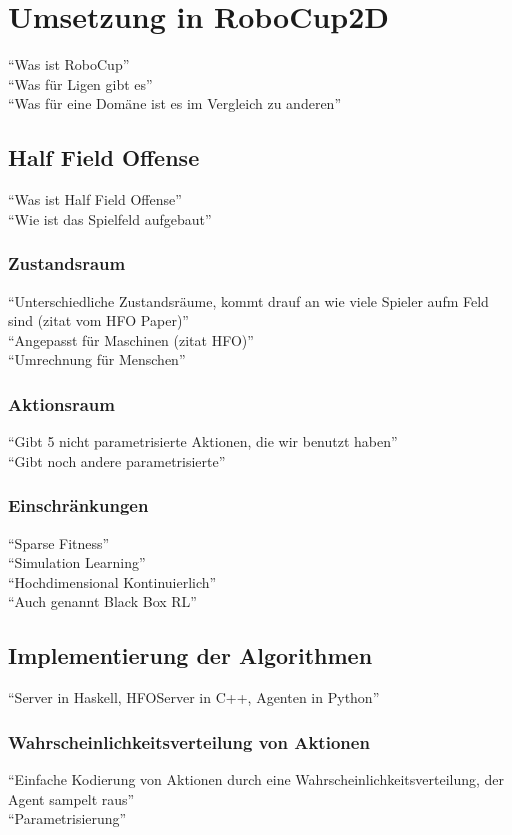 \chapter{Umsetzung in RoboCup2D}
    ``Was ist RoboCup'' \\
    ``Was für Ligen gibt es'' \\
    ``Was für eine Domäne ist es im Vergleich zu anderen''
    \section{Half Field Offense}
        ``Was ist Half Field Offense'' \\
        ``Wie ist das Spielfeld aufgebaut''
        \subsection{Zustandsraum}
            ``Unterschiedliche Zustandsräume, kommt drauf an wie viele Spieler aufm Feld sind (zitat vom HFO Paper)''\\
            ``Angepasst für Maschinen (zitat HFO)'' \\
            ``Umrechnung für Menschen''
        \subsection{Aktionsraum}
            ``Gibt 5 nicht parametrisierte Aktionen, die wir benutzt haben''\\
            ``Gibt noch andere parametrisierte''
        \subsection{Einschränkungen}
            ``Sparse Fitness''                 \\
            ``Simulation Learning''            \\
            ``Hochdimensional Kontinuierlich'' \\
            ``Auch genannt Black Box RL''

    \section{Implementierung der Algorithmen}
        ``Server in Haskell, HFOServer in C++, Agenten in Python''
        \subsection{Wahrscheinlichkeitsverteilung von Aktionen}
            ``Einfache Kodierung von Aktionen durch eine Wahrscheinlichkeitsverteilung, der Agent sampelt raus''\\
            ``Parametrisierung''
